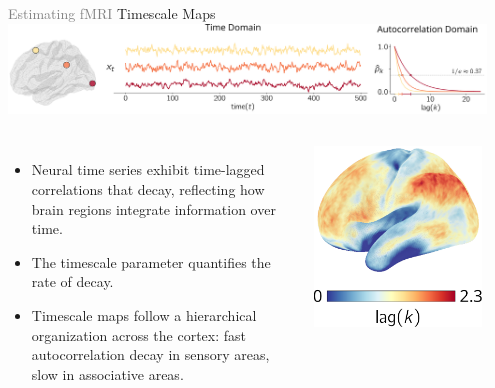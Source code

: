 \documentclass[8pt,aspectratio=169]{beamer}
\begin{document}
\begin{frame}{\textcolor{gray}{Estimating fMRI} Timescale Maps}
    \centering\includegraphics[width=0.95\textwidth]{docs/wnar/timescale.pdf}
    \vfill
    \begin{columns}
        \begin{itemize}
        \item Neural time series exhibit time-lagged correlations that decay, reflecting how brain regions integrate information over time.
        \item The timescale parameter quantifies the rate of decay.
        \item Timescale maps follow a hierarchical organization across the cortex: fast autocorrelation decay in sensory areas, slow in associative areas.
    \end{itemize}
    \includegraphics[width=0.85\textwidth]{docs/wnar/timescale-brain.pdf}
    \end{columns}
\end{frame}
\end{document}
